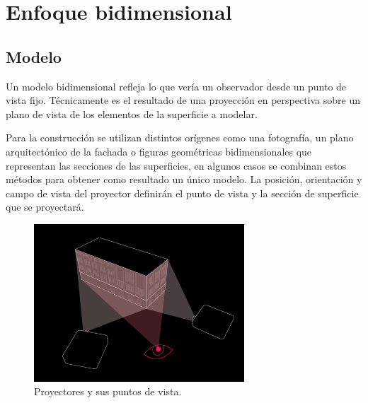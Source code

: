 \section{Enfoque bidimensional}
\subsection{Modelo}
Un modelo bidimensional refleja lo que vería un observador desde un punto de vista fijo.
Técnicamente es el resultado de una proyección en perspectiva \cite{LibroCompGrafica} sobre un plano de vista de los elementos de la superficie a modelar.

Para la construcción se utilizan distintos orígenes como una fotografía, un plano arquitectónico de la fachada o figuras geométricas bidimensionales que representan las secciones de las superficies, en algunos casos se combinan estos métodos para obtener como resultado un único modelo.
La posición, orientación y campo de vista del proyector definirán el punto de vista y la sección de superficie que se proyectará.
\begin{figure}[H]
  \centering
    \includegraphics[width=0.7\textwidth]{./Cap2_videomapping/diagrama-2proyectores}
  \caption{Proyectores y sus puntos de vista.}
  \label{fig:diagrama-2proyectores}
\end{figure}

